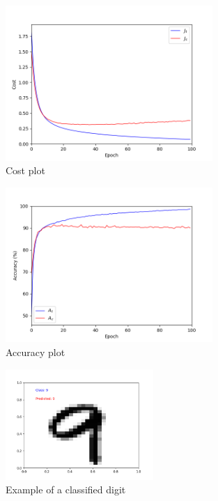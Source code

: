 	\begin{figure}[H]
	  \centering
	  \includegraphics[width=0.7\textwidth]{figures/ch6_nnccost.png}
	  \caption{Cost plot}
	\end{figure}
	
	\begin{figure}[H]
	  \centering
	  \includegraphics[width=0.7\textwidth]{figures/ch6_nncaccuracy.png}
	  \caption{Accuracy plot}
	\end{figure}
	
	\begin{figure}[H]
	  \centering
	  \includegraphics[width=0.5\textwidth]{figures/ch6_nncdigit.png}
	  \caption{Example of a classified digit}
	\end{figure}
	

